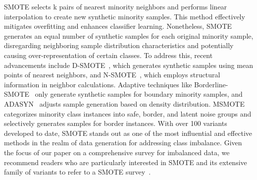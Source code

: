 SMOTE selects k pairs of nearest minority neighbors and performs linear interpolation to create new synthetic minority samples. This method effectively mitigates overfitting and enhances classifier learning. Nonetheless, SMOTE generates an equal number of synthetic samples for each original minority sample, disregarding neighboring sample distribution characteristics and potentially causing over-representation of certain classes. To address this, recent advancements include D-SMOTE~\cite{ref_10}, which generates synthetic samples using mean points of nearest neighbors, and N-SMOTE~\cite{ref_11}, which employs structural information in neighbor calculations. Adaptive techniques like Borderline-SMOTE~\cite{ref_4} only generate synthetic samples for boundary minority samples, and ADASYN~\cite{ref_5} adjusts sample generation based on density distribution. MSMOTE~\cite{ref_12} categorizes minority class instances into safe, border, and latent noise groups and selectively generates samples for border instances. With over 100 variants developed to date, SMOTE stands out as one of the most influential and effective methods in the realm of data generation for addressing class imbalance. Given the focus of our paper on a comprehensive survey for imbalanced data, we recommend readers who are particularly interested in SMOTE and its extensive family of variants to refer to a SMOTE survey~\cite{smote-comparison}.

